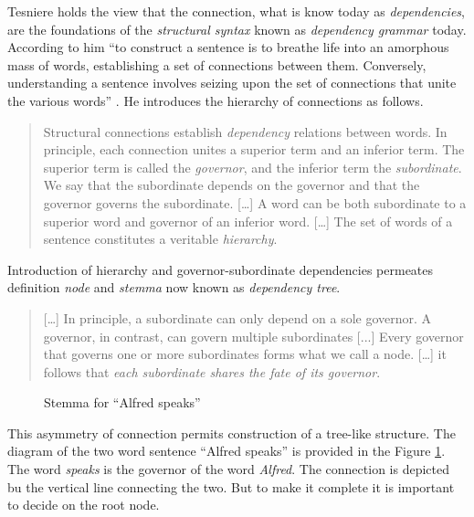 Tesniere holds the view that the connection, what is know today as \textit{dependencies}, are the foundations of the \textit{structural syntax} known as \textit{dependency grammar} today. According to him ``to construct a sentence is to breathe life into an amorphous mass of words, establishing a set of connections between them. Conversely, understanding a sentence involves seizing upon the set of connections that unite the various words'' \citep[4]{Tesniere2015}. He introduces the hierarchy of connections as follows. 

\begin{quotation}
    Structural connections establish \textit{dependency} relations between words. In principle, each connection unites a superior term and an inferior term. The superior term is called the \textit{governor}, and the inferior term the \textit{subordinate}. We say that the subordinate depends on the governor and that the governor governs the subordinate. [\dots] A word can be both subordinate to a superior word and governor of an inferior word. [\dots] The set of words of a sentence constitutes a veritable \textit{hierarchy}. \citep[5--6]{Tesniere2015}
\end{quotation}

Introduction of hierarchy and governor-subordinate dependencies permeates definition \textit{node} and \textit{stemma} now known as \textit{dependency tree}. 

\begin{quotation}
    [\dots] In principle, a subordinate can only depend on a sole governor. A governor, in contrast, can govern multiple subordinates [...] Every governor that governs one or more subordinates forms what we call a node.  [\dots] it follows that \textit{each subordinate shares the fate of its governor}. \citep[6]{Tesniere2015}
\end{quotation}

\begin{figure}[!ht]
    \centering
    \label{fig:stemma1}
    \caption{Stemma for ``Alfred speaks''}
\end{figure}

This asymmetry of connection permits construction of a tree-like structure. The diagram of the two word sentence ``Alfred speaks'' is provided in the Figure \ref{fig:stemma1}. The word \textit{speaks} is the governor of the word \textit{Alfred}. The connection is depicted bu the vertical line connecting the two. But to make it complete it is important to decide on the root node. 

